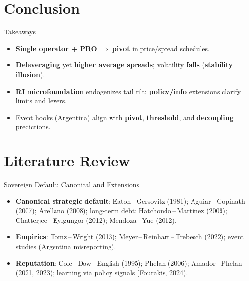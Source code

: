\documentclass[aspectratio=169,11pt,professionalfonts]{beamer}
\newcommand{\1}{\mathbb{1}}
\begin{document}
\section{Conclusion}

\begin{frame}{Takeaways}
  \begin{itemize}
    \item \textbf{Single operator + PRO} $\Rightarrow$ \textbf{pivot} in price/spread schedules.
    \item \textbf{Deleveraging} yet \textbf{higher average spreads}; volatility \textbf{falls} (\textbf{stability illusion}).
    \item \textbf{RI microfoundation} endogenizes tail tilt; \textbf{policy/info} extensions clarify limits and levers.
    \item Event hooks (Argentina) align with \textbf{pivot}, \textbf{threshold}, and
          \textbf{decoupling} predictions.
  \end{itemize}
\end{frame}

\section{Literature Review}

\begin{frame}{Sovereign Default: Canonical and Extensions}
  \begin{itemize}
    \item \textbf{Canonical strategic default}: Eaton\,–\,Gersovitz (1981); Aguiar\,–\,Gopinath (2007); Arellano (2008);
          long-term debt: Hatchondo\,–\,Martinez (2009); Chatterjee\,–\,Eyigungor (2012); Mendoza\,–\,Yue (2012).
    \item \textbf{Empirics}: Tomz\,–\,Wright (2013); Meyer\,–\,Reinhart\,–\,Trebesch (2022); event studies (Argentina misreporting).
    \item \textbf{Reputation}: Cole\,–\,Dow\,–\,English (1995); Phelan (2006); Amador\,–\,Phelan (2021, 2023);
          learning via policy signals (Fourakis, 2024).
  \end{itemize}
\end{frame}
\end{document}
